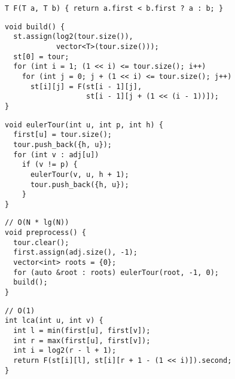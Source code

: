 \documentclass[twoside]{article}
\begin{document}
\begin{multicols*}{2}
\begin{verbatim}
T F(T a, T b) { return a.first < b.first ? a : b; }
\end{verbatim}
\vspace{-12pt}
\begin{verbatim}
void build() {
  st.assign(log2(tour.size()),
            vector<T>(tour.size()));
  st[0] = tour;
  for (int i = 1; (1 << i) <= tour.size(); i++)
    for (int j = 0; j + (1 << i) <= tour.size(); j++)
      st[i][j] = F(st[i - 1][j],
                   st[i - 1][j + (1 << (i - 1))]);
}
\end{verbatim}
\vspace{-12pt}
\begin{verbatim}
void eulerTour(int u, int p, int h) {
  first[u] = tour.size();
  tour.push_back({h, u});
  for (int v : adj[u])
    if (v != p) {
      eulerTour(v, u, h + 1);
      tour.push_back({h, u});
    }
}
\end{verbatim}
\vspace{-12pt}
\begin{verbatim}
// O(N * lg(N))
void preprocess() {
  tour.clear();
  first.assign(adj.size(), -1);
  vector<int> roots = {0};
  for (auto &root : roots) eulerTour(root, -1, 0);
  build();
}
\end{verbatim}
\vspace{-12pt}
\begin{verbatim}
// O(1)
int lca(int u, int v) {
  int l = min(first[u], first[v]);
  int r = max(first[u], first[v]);
  int i = log2(r - l + 1);
  return F(st[i][l], st[i][r + 1 - (1 << i)]).second;
}
\end{verbatim}

\subsectionfont{\large\bfseries\sffamily\underline}

\end{multicols*}
\end{document}
